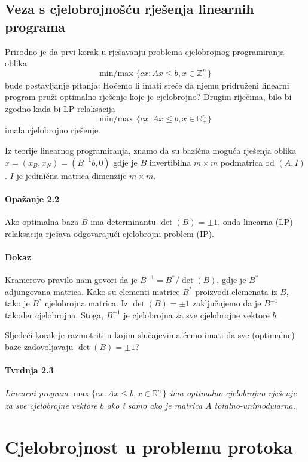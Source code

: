 \documentclass[11pt, a4paper]{article}
\begin{document}
	\subsection*{Veza s cjelobrojnošću rješenja linearnih programa}
	
	Prirodno je da prvi korak u rješavanju problema cjelobrojnog programiranja oblika
	\[ \text{min/max } \{cx : Ax \leq b, x \in \mathbb{Z}^n_{+}\} \]
	bude postavljanje pitanja: Hoćemo li imati sreće da njemu pridruženi linearni program pruži optimalno rješenje koje je cjelobrojno? Drugim riječima, bilo bi zgodno kada bi LP relaksacija
	\[ \text{min/max } \{cx : Ax \leq b, x \in \mathbb{R}^n_{+}\} \]
	imala cjelobrojno rješenje.
	
	Iz teorije linearnog programiranja, znamo da su bazična moguća rješenja oblika $ x = (x_B, x_N) = (B^{-1}b, 0) $
	gdje je $B$ invertibilna $m \times m$ podmatrica od $(A,I)$. $I$ je jedinična matrica dimenzije $m \times m$.
	
	\paragraph{Opažanje 2.2}
	Ako optimalna baza $B$ ima determinantu $\det(B) = \pm 1$, onda linearna (LP) relaksacija rješava odgovarajući cjelobrojni problem (IP).
	
	\paragraph{Dokaz}
	Kramerovo pravilo nam govori da je $B^{-1} = B^*/\det(B)$, gdje je $B^*$ adjungovana matrica. Kako su elementi matrice $B^*$ proizvodi elemenata iz $B$, tako je $B^*$ cjelobrojna matrica. Iz $\det(B) = \pm 1$ zaključujemo da je $B^{-1}$ također cjelobrojna. Stoga, $B^{-1}$ je cjelobrojna za sve cjelobrojne vektore $b$.
	
	Sljedeći korak je razmotriti u kojim slučajevima ćemo imati da sve (optimalne) baze zadovoljavaju $\det(B)=\pm1$?
	
	\paragraph{Tvrdnja 2.3}
	\textit{Linearni program $\max\{cx : Ax \leq b, x \in \mathbb{R}^{n}_{+}\}$ ima optimalno cjelobrojno rješenje za sve cjelobrojne vektore $b$ ako i samo ako je matrica $A$ totalno-unimodularna.}
	
	\newpage
	\section{Cjelobrojnost u problemu protoka}
	
\end{document}
